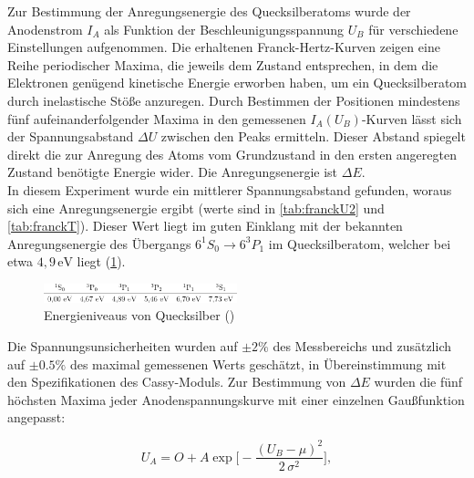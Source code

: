 Zur Bestimmung der Anregungsenergie des Quecksilberatoms wurde der Anodenstrom $I_A$ als Funktion der Beschleunigungsspannung $U_B$ für verschiedene Einstellungen aufgenommen. Die erhaltenen Franck-Hertz-Kurven zeigen eine Reihe periodischer Maxima, die jeweils dem Zustand entsprechen, in dem die Elektronen genügend kinetische Energie erworben haben, um ein Quecksilberatom durch inelastische Stöße anzuregen. Durch Bestimmen der Positionen mindestens fünf aufeinanderfolgender Maxima in den gemessenen $I_A(U_B)$-Kurven lässt sich der Spannungsabstand $\Delta U$ zwischen den Peaks ermitteln. Dieser Abstand spiegelt direkt die zur Anregung des Atoms vom Grundzustand in den ersten angeregten Zustand benötigte Energie wider. Die Anregungsenergie ist $\Delta E$. 
\vspace{0.3cm}\\
In diesem Experiment wurde ein mittlerer Spannungsabstand gefunden, woraus sich eine Anregungsenergie ergibt (werte sind in \cref{tab:franckU2} und \cref{tab:franckT}). Dieser Wert liegt im guten Einklang mit der bekannten Anregungsenergie des Übergangs $6^1S_0 \to 6^3P_1$ im Quecksilberatom, welcher bei etwa $4{,}9\,\mathrm{eV}$ liegt (\cref{fig:Hg_energyLevels}).
\vspace{0.3cm}
\begin{figure}[H]
    \centering
    \includegraphics[width=0.5\textwidth]{figs/EnergieniveausvonQuecksilber.png}
    \caption{Energieniveaus von Quecksilber (\cite{praktikum4}) }
    \label{fig:Hg_energyLevels}
\end{figure}

Die Spannungsunsicherheiten wurden auf $\pm 2\%$ des Messbereichs und zusätzlich auf $\pm 0.5\%$ des maximal gemessenen Werts geschätzt, in Übereinstimmung mit den Spezifikationen des Cassy-Moduls. Zur Bestimmung von $\Delta E$ wurden die fünf höchsten Maxima jeder Anodenspannungskurve mit einer einzelnen Gaußfunktion angepasst:

\begin{equation}
  U_A = O + A \exp\!\biggl[-\frac{(U_B - \mu)^2}{2\,\sigma^2}\biggr],
\end{equation}


